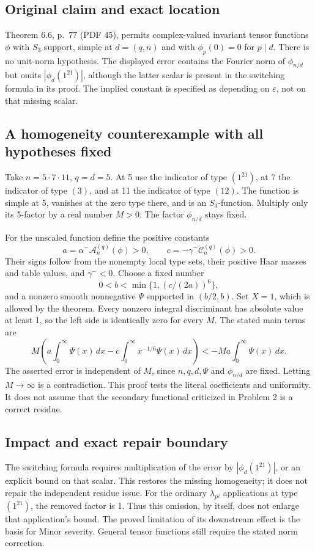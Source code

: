 \documentclass[10pt]{article}
\begin{document}
\subsection*{Original claim and exact location}
Theorem 6.6, p. 77 (PDF 45), permits complex-valued invariant tensor functions \(\phi\) with \(S_3\) support, simple at \(d=(q,n)\) and with \(\phi_p(0)=0\) for \(p\mid d\). There is no unit-norm hypothesis. The displayed error contains the Fourier norm of \(\phi_{n/d}\) but omits \(|\phi_d(1^21)|\), although the latter scalar is present in the switching formula in its proof. The implied constant is specified as depending on \(\varepsilon\), not on that missing scalar.\par
\subsection*{A homogeneity counterexample with all hypotheses fixed}
Take \(n=5\cdot7\cdot11\), \(q=d=5\). At 5 use the indicator of type \((1^21)\), at 7 the indicator of type \((3)\), and at 11 the indicator of type \((12)\). The function is simple at 5, vanishes at the zero type there, and is an \(S_3\)-function. Multiply only its 5-factor by a real number \(M>0\). The factor \(\phi_{n/d}\) stays fixed.\par
For the unscaled function define the positive constants \[a=\alpha^-\mathcal A_n^{(q)}(\phi)>0,\qquad
 c=-\gamma^-\mathcal C_n^{(q)}(\phi)>0.\] Their signs follow from the nonempty local type sets, their positive Haar masses and table values, and \(\gamma^-<0\). Choose a fixed number \[0<b<\min\{1,(c/(2a))^6\},\] and a nonzero smooth nonnegative \(\Psi\) supported in \((b/2,b)\). Set \(X=1\), which is allowed by the theorem. Every nonzero integral discriminant has absolute value at least 1, so the left side is identically zero for every \(M\). The stated main terms are \[M\left(a\int_0^\infty\Psi(x)\,dx
       -c\int_0^\infty x^{-1/6}\Psi(x)\,dx\right)
 <-Ma\int_0^\infty\Psi(x)\,dx.\] The asserted error is independent of \(M\), since \(n,q,d,\Psi\) and \(\phi_{n/d}\) are fixed. Letting \(M\to\infty\) is a contradiction. This proof tests the literal coefficients and uniformity. It does not assume that the secondary functional criticized in Problem 2 is a correct residue.\par
\subsection*{Impact and exact repair boundary}
The switching formula requires multiplication of the error by \(|\phi_d(1^21)|\), or an explicit bound on that scalar. This restores the missing homogeneity; it does not repair the independent residue issue. For the ordinary \(\lambda_{p^j}\) applications at type \((1^21)\), the removed factor is 1. Thus this omission, by itself, does not enlarge that application’s bound. The proved limitation of its downstream effect is the basis for Minor severity. General tensor functions still require the stated norm correction.\par
\end{document}
